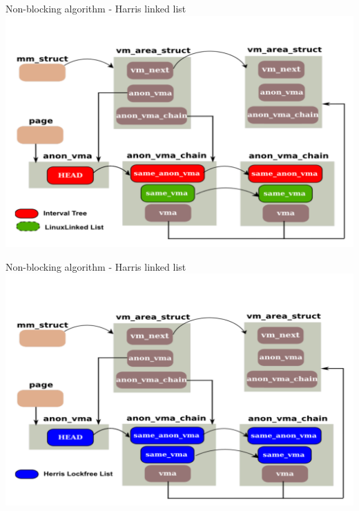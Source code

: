 \documentclass[english]{beamer} %
\begin{document}
\begin{frame}{Non-blocking algorithm - Harris linked list}
\includegraphics[scale=0.5]{fig/lockfree}
\end{frame}


\begin{frame}{Non-blocking algorithm - Harris linked list}
\includegraphics[scale=0.5]{fig/lockfree_2}
\end{frame}
\end{document}
